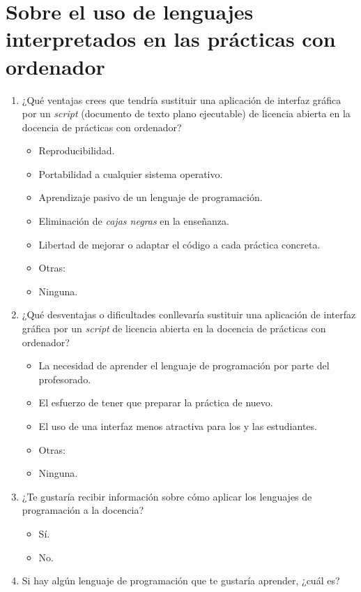 \documentclass[a4paper,12pt]{article}
\newcounter{preg}[section]
\begin{document}
\section{Sobre el uso de lenguajes interpretados en las prácticas con ordenador}
\begin{enumerate}
\item {} ¿Qué ventajas crees que tendría sustituir una aplicación de interfaz gráfica
      por un \emph{script} (documento de texto plano ejecutable) de licencia abierta en la docencia de
      prácticas con ordenador?
   \begin{itemize}
   \item Reproducibilidad.
   \item Portabilidad a cualquier sistema operativo.
   \item Aprendizaje pasivo de un lenguaje de programación.
   \item Eliminación de \emph{cajas negras} en la enseñanza.
   \item Libertad de mejorar o adaptar el código a cada práctica concreta.
   \item Otras:
   \item Ninguna.
   \end{itemize}

\item {} ¿Qué desventajas o dificultades conllevaría sustituir una aplicación de interfaz gráfica por un
   \emph{script} de licencia abierta en la docencia de prácticas con ordenador?
   \begin{itemize}
   \item La necesidad de aprender el lenguaje de programación por parte del profesorado.
   \item El esfuerzo de tener que preparar la práctica de nuevo.
   \item El uso de una interfaz menos atractiva para los y las estudiantes.
   \item Otras:
   \item Ninguna.
   \end{itemize}

\item {} ¿Te gustaría recibir información sobre cómo aplicar los lenguajes de programación a la
      docencia?
   \begin{itemize}
   \item Sí.
   \item No.
   \end{itemize}

\item Si hay algún lenguaje de programación que te gustaría aprender, ¿cuál es?
\vspace*{1cm}
\end{enumerate}
\end{document}
